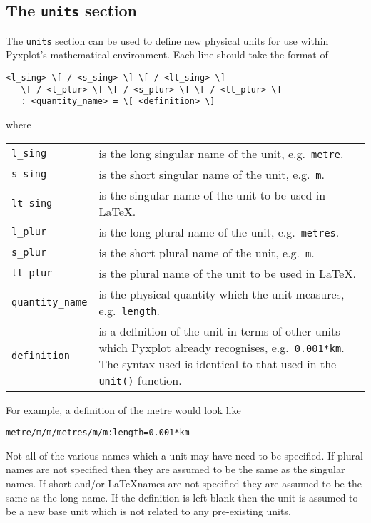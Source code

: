 \renewcommand{\arraystretch}{1.00}

\subsection{The {\tt units} section}
\label{sec:configfile_units}

The {\tt units} section can be used to define new physical units for use within
Pyxplot's mathematical environment. Each line should take the format of
\begin{verbatim}
<l_sing> \[ / <s_sing> \] \[ / <lt_sing> \]
   \[ / <l_plur> \] \[ / <s_plur> \] \[ / <lt_plur> \]
   : <quantity_name> = \[ <definition> \]
\end{verbatim}
where
\begin{longtable}{p{3.4cm}p{9cm}}
{\tt l\_sing} & is the long singular name of the unit, e.g.\ {\tt metre}.\\
{\tt s\_sing} & is the short singular name of the unit, e.g.\ {\tt m}.\\
{\tt lt\_sing} & is the singular name of the unit to be used in \LaTeX.\\
{\tt l\_plur} & is the long plural name of the unit, e.g.\ {\tt metres}.\\
{\tt s\_plur} & is the short plural name of the unit, e.g.\ {\tt m}.\\
{\tt lt\_plur} & is the plural name of the unit to be used in \LaTeX.\\
{\tt quantity\_name} & is the physical quantity which the unit measures, e.g.\ {\tt length}.\\
{\tt definition} & is a definition of the unit in terms of other units which
Pyxplot already recognises, e.g.\ {\tt 0.001*km}. The syntax used is identical
to that used in the {\tt unit()} function.\\
\end{longtable}
For example, a definition of the metre would look like
\begin{verbatim}
metre/m/m/metres/m/m:length=0.001*km
\end{verbatim}

Not all of the various names which a unit may have need to be specified. If
plural names are not specified then they are assumed to be the same as the
singular names. If short and/or \LaTeX names are not specified they are assumed
to be the same as the long name. If the definition is left blank then the unit
is assumed to be a new base unit which is not related to any pre-existing
units.

